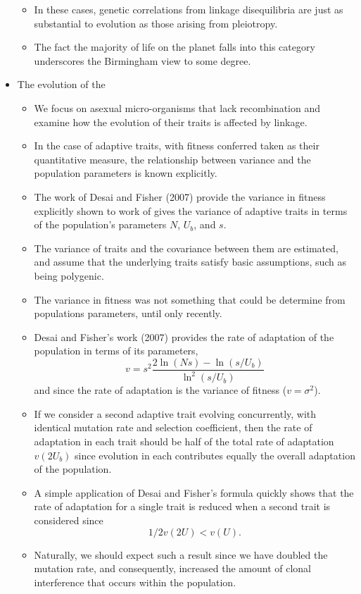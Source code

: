 \documentclass[11pt,one column]{article}
\begin{document}
\begin{itemize}
\begin{itemize}
	\item In these cases, genetic correlations from linkage disequilibria are just as substantial to evolution as those arising from pleiotropy.
	\item The fact the majority of life on the planet falls into this category underscores the Birmingham view to some degree.
	\end{itemize}
\item The evolution of the 
	\begin{itemize}
	\item We focus on asexual micro-organisms that lack recombination and examine how the evolution of their traits is affected by linkage.	
	\item In the case of adaptive traits, with fitness conferred taken as their quantitative measure, the relationship between variance and the population parameters is known explicitly. 
	\item The work of Desai and Fisher (2007) provide the variance in fitness explicitly shown to work of gives the variance of adaptive traits in terms of the population’s parameters $N$, $U_b$, and $s$. 
	\item The variance of traits and the covariance between them are estimated, and assume that the underlying traits satisfy basic assumptions, such as being polygenic. 
	\item The variance in fitness was not something that could be determine from populations parameters, until only recently. 
	\item Desai and Fisher’s work (2007) provides the rate of adaptation of the population in terms of its parameters, \[v =s^2  \frac{2 \ln(Ns)-\ln(s/U_b)}{\ln^2(s/U_b)}\] and since the rate of adaptation is the variance of fitness ($v=\sigma^2$).
	\item If we consider a second adaptive trait evolving concurrently, with identical mutation rate and selection coefficient, then the rate of adaptation in each trait should be half of the total rate of adaptation $v(2U_b)$ since evolution in each contributes equally the overall adaptation of the population. 
	\item A simple application of Desai and Fisher’s formula quickly shows that the rate of adaptation for a single trait is reduced when a second trait is considered since \[ 1/2  v(2U)<v(U). \]
	\item Naturally, we should expect such a result since we have doubled the mutation rate, and consequently, increased the amount of clonal interference that occurs within the population. 

\end{itemize}
\end{itemize}
\end{document}
